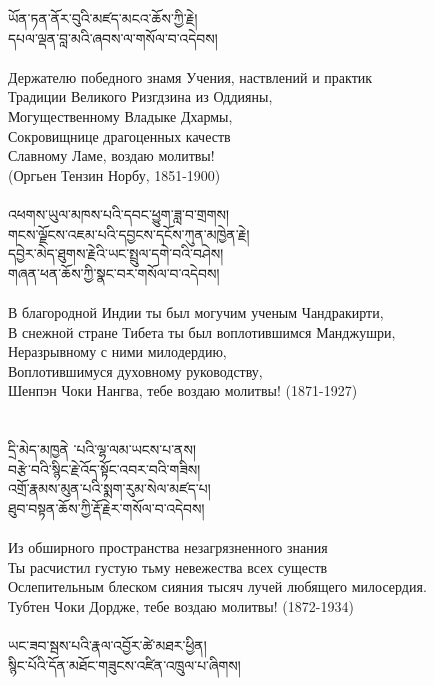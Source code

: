 ཡོན་ཏན་ནོར་བུའི་མཛད་མངའ་ཆོས་ཀྱི་རྗེ། \\
དཔལ་ལྡན་བླ་མའི་ཞབས་ལ་གསོལ་བ་འདེབས།\\
\\
\ru
Держателю победного знамя Учения, наствлений и практик\\
Традиции Великого Ризгдзина из Оддияны,\\
Могущественному Владыке Дхармы, \\
Сокровищнице драгоценных качеств \\
Славному Ламе, воздаю молитвы! \\ \hspace{1cm} (Оргьен Тензин Норбу, 1851-1900)\\
\\
\newpage
\ti
འཕགས་ཡུལ་མཁས་པའི་དབང་ཕྱུག་ཟླ་བ་གྲགས། \\
གངས་ལྗོངས་འཇམ་པའི་དབྱངས་དངོས་ཀུན་མཁྱེན་རྗེ། \\
དབྱེར་མེད་ཐུགས་རྗེའི་ཡང་སྤྲུལ་དགེ་བའི་བཤེས། \\
གཞན་ཕན་ཆོས་ཀྱི་སྣང་བར་གསོལ་བ་འདེབས།\\
\\
\ru
В благородной Индии ты был могучим ученым Чандракирти,\\
В снежной стране Тибета ты был воплотившимся Манджушри,\\
Неразрывному с ними милодердию, \\
Воплотившимуся духовному руководству, \\
Шенпэн Чоки Нангва, тебе воздаю молитвы! (1871-1927)\\
\\
\\
\ti
དྲི་མེད་མཁྱནེ ་པའི་ལྷ་ལམ་ཡངས་པ་ནས། \\
བརྩེ་བའི་སྙིང་རྗེ་འོད་སྟོང་འབར་བའི་གཟིས། \\
འགྲོ་རྣམས་མུན་པའི་སྨག་རུམ་སེལ་མཛད་པ། \\
ཐུབ་བསྟན་ཆོས་ཀྱི་རྡོ་རྗེར་གསོལ་བ་འདེབས།\\
\\
\ru
Из обширного пространства незагрязненного знания\\
Ты расчистил густую тьму невежества всех существ\\
Ослепительным блеском сияния тысяч лучей любящего милосердия. \\
Тубтен Чоки Дордже, тебе воздаю молитвы! (1872-1934)\\
\\
\newpage
\ti
ཡང་ཟབ་སྦས་པའི་རྣལ་འབྱོར་ཚེ་མཐར་ཕྱིན། \\
སྙིང་པོའི་དོན་མཐོང་གཟུངས་འཛིན་འཁྲུལ་པ་ཞིགས། \\
